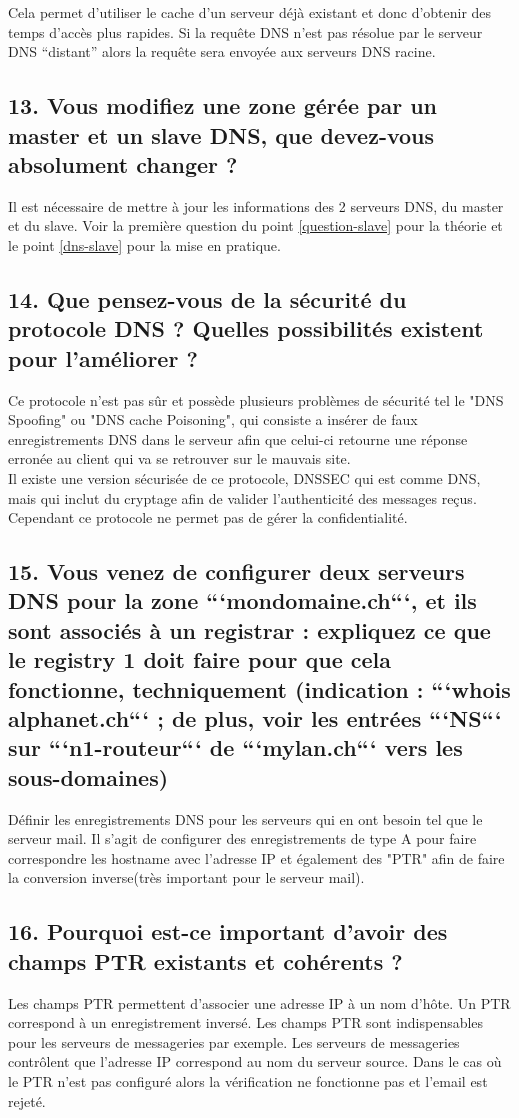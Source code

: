 \documentclass{article}
\begin{document}
Cela permet d'utiliser le cache d'un serveur déjà existant et donc d'obtenir des temps d'accès plus rapides. Si la requête DNS n'est pas résolue par le serveur DNS “distant” alors la requête sera envoyée aux serveurs DNS racine.

\subsection*{13. Vous modifiez une zone gérée par un master et un slave DNS, que devez-vous absolument changer ?}
Il est nécessaire de mettre à jour les informations des 2 serveurs DNS, du master et du slave. Voir la première question du point \ref{question-slave} pour la théorie et le point \ref{dns-slave} pour la mise en pratique.

\subsection*{14. Que pensez-vous de la sécurité du protocole DNS ? Quelles possibilités existent pour l’améliorer ?}
Ce protocole n'est pas sûr et possède plusieurs problèmes de sécurité tel le "DNS Spoofing" ou "DNS cache Poisoning", qui consiste a insérer de faux enregistrements DNS dans le serveur afin que celui-ci retourne une réponse erronée au client qui va se retrouver sur le mauvais site.\cite{attaques}\\

Il existe une version sécurisée de ce protocole, DNSSEC qui est comme DNS, mais qui inclut du cryptage afin de valider l'authenticité des messages reçus. Cependant ce protocole ne permet pas de gérer la confidentialité.\cite{DNSSEC}

\subsection*{15. Vous venez de configurer deux serveurs DNS pour la zone ```mondomaine.ch```, et ils sont associés à un registrar : expliquez ce que le registry 1 doit faire pour que cela fonctionne, techniquement (indication : ```whois alphanet.ch``` ; de plus, voir les entrées ```NS``` sur ```n1-routeur``` de ```mylan.ch``` vers les sous-domaines)}
Définir les enregistrements DNS pour les serveurs qui en ont besoin tel que le serveur mail. Il s'agit de configurer des enregistrements de type A pour faire correspondre les hostname avec l'adresse IP et également des "PTR" afin de faire la conversion inverse(très important pour le serveur mail).

\subsection*{16. Pourquoi est-ce important d’avoir des champs PTR existants et cohérents ?}
Les champs PTR permettent d'associer une adresse IP à un nom d'hôte. Un PTR correspond à un enregistrement inversé. Les champs PTR sont indispensables pour les serveurs de messageries par exemple.
Les serveurs de messageries contrôlent que l'adresse IP correspond au nom du serveur source. Dans le cas où le PTR n'est pas configuré alors la vérification ne fonctionne pas et l'email est rejeté.
\end{document}
